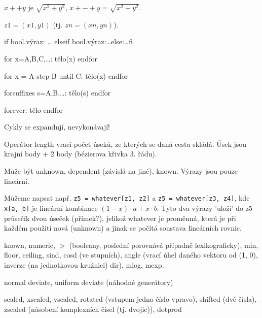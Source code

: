 \documentclass[12pt]{article}					%
\begin{document}
    \begin{definice}
        $x++y$ je $\sqrt{x^2 + y^2}$, $x+-+y = \sqrt{x^2 - y^2}$.

        $z1 = (x1, y1)$ (tj. $zn = (xn, yn)$).
    \end{definice}

    \begin{definice}
        if bool.výraz: … elseif bool.výraz:…else:…fi

        for x=A,B,C,…: tělo(x) endfor

        for x = A step B until C: tělo(x) endfor
        
        forsuffixes s=A,B,…: tělo(s) endfor

        forever: tělo endfor
    \end{definice}

    \begin{upozorneni}
        Cykly se expandují, nevykonávají!
    \end{upozorneni}

    \begin{definice}[Cesty]
        Operátor length vrací počet úseků, ze kterých se daná cesta skládá. Úsek jsou krajní body + 2 body (bézierova křivka 3. řádu).
    \end{definice}


    \begin{definice}[numeric]
        Může být unknown, dependent (závislá na jiné), known. Výrazy jsou pouze lineární.

        Můžeme napsat např. \verb|z5 = whatever[z1, z2]| a \verb|z5 = whatever[z3, z4]|, kde \verb|x[a, b]| je lineární kombinace $(1-x)·a + x·b$. Tyto dva výrazy 'uloží' do z5 průsečík dvou úseček (přímek?), jelikož whatever je proměnná, která je při každém použití nová (unknown) a jinak se počítá soustava lineárních rovnic.
    \end{definice}

    \begin{definice}
        known, numeric, $>$ (booleany, poslední porovnává případně lexikograficky), min, floor, ceiling, sind, cosd (ve stupních), angle (vrací úhel daného vektoru od (1, 0), inverze (na jednotkovou kružnici) dir), mlog, mexp.

        normal deviate, uniform deviate (náhodné generátory)
    \end{definice}

    \begin{definice}[Transformace (vstupem dvojice čísel = komplexní číslo vlevo)]
        scaled, xscaled, yscaled, rotated (vstupem jedno číslo vpravo), shifted (dvě čísla), zscaled (násobení komplexních čísel (tj. dvojic)), dotprod
    \end{definice}
\end{document}
